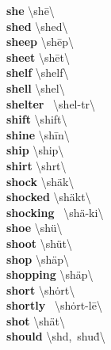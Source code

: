 \documentclass[10pt,a4paper]{article}
\begin{document}
\begin{multicols}{2}
\textbf{ she }\quad \textbackslash \textprimstress sh\={e}\textbackslash \\
\textbf{ shed }\quad \textbackslash \textprimstress shed\textbackslash \\
\textbf{ sheep }\quad \textbackslash \textprimstress sh\={e}p\textbackslash \\
\textbf{ sheet }\quad \textbackslash \textprimstress sh\={e}t\textbackslash \\
\textbf{ shelf }\quad \textbackslash \textprimstress shelf\textbackslash \\
\textbf{ shell }\quad \textbackslash \textprimstress shel\textbackslash \\
\textbf{ shelter }\quad \ \textbackslash \textprimstress shel-t\textschwa r\textbackslash \\
\textbf{ shift }\quad \textbackslash \textprimstress shift\textbackslash \\
\textbf{ shine }\quad \textbackslash \textprimstress sh\={i}n\textbackslash \\
\textbf{ ship }\quad \textbackslash \textprimstress ship\textbackslash \\
\textbf{ shirt }\quad \textbackslash \textprimstress sh\textschwa rt\textbackslash \\
\textbf{ shock }\quad \textbackslash \textprimstress sh\"{a}k\textbackslash \\
\textbf{ shocked }\quad \textbackslash \textprimstress sh\"{a}kt\textbackslash \\
\textbf{ shocking }\quad \ \textbackslash \textprimstress sh\"{a}-ki\engma \textbackslash \\
\textbf{ shoe }\quad \textbackslash \textprimstress sh\"{u}\textbackslash \\
\textbf{ shoot }\quad \textbackslash \textprimstress sh\"{u}t\textbackslash \\
\textbf{ shop }\quad \textbackslash \textprimstress sh\"{a}p\textbackslash \\
\textbf{ shopping }\quad \textbackslash \textprimstress sh\"{a}p\textbackslash \\
\textbf{ short }\quad \textbackslash \textprimstress sh\.{o}rt\textbackslash \\
\textbf{ shortly }\quad \ \textbackslash \textprimstress sh\.{o}rt-l\={e}\textbackslash \\
\textbf{ shot }\quad \textbackslash \textprimstress sh\"{a}t\textbackslash \\
\textbf{ should }\quad \textbackslash sh\textschwa d,\ \textprimstress shu\. d\textbackslash \\

\end{multicols}
\end{document}
